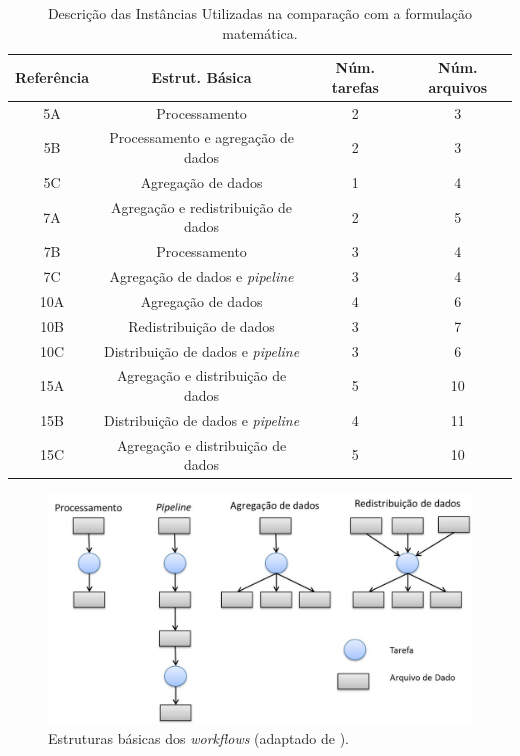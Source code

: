 \begin{table}[!ht]

    \begin{center}
        \caption{Descrição das Instâncias Utilizadas na comparação com a formulação matemática.}
        \label{tabletoy}
        
         \begin{tabular}{|c |c |c |c |}
            \hline
            \textbf{\textbf{Referência}} & \textbf{Estrut. Básica} & \textbf{Núm. tarefas} & \textbf{Núm. arquivos}\\
            \hline\hline
                5A           & Processamento                            & 2     & 3\\
                5B           & Processamento e agregação de dados       & 2     & 3\\
                5C           & Agregação de dados                       & 1     & 4\\
                \hline
                7A          &   Agregação e redistribuição de dados     & 2     & 5\\ 
                7B          &   Processamento                           & 3     & 4\\
                7C          &   Agregação de dados e \textit{pipeline}  & 3     & 4\\
                \hline
                10A         & Agregação de dados                        & 4  & 6\\
                10B         & Redistribuição de dados                   & 3  & 7\\
                10C         & Distribuição de dados e \textit{pipeline} & 3  & 6\\
                \hline
                15A         & Agregação e distribuição de dados         & 5  & 10\\
                15B         & Distribuição de dados e \textit{pipeline} & 4  & 11\\
                15C         & Agregação e distribuição de dados         & 5  & 10\\                  
             \hline
         \end{tabular}
    \end{center}
\end{table}


\begin{figure}[H]
\centering
\includegraphics[width=.6\linewidth]{figure/structure.jpg}
\caption{Estruturas básicas dos \textit{workflows} (adaptado de \cite{Bharathi2008}).}
\label{fig:structure}
\end{figure}


